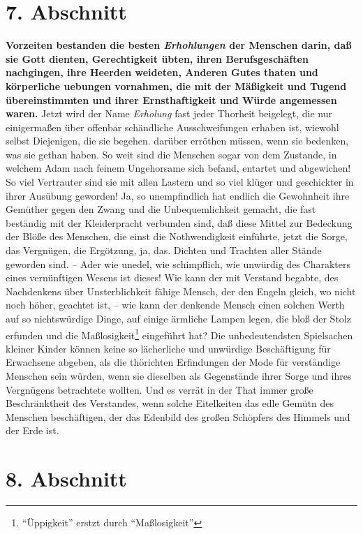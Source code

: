 \section{7. Abschnitt} \label{kap14_ab7}

 \textbf{Vorzeiten bestanden die besten \textit{Erhohlungen} der Menschen darin, daß sie Gott
dienten, Gerechtigkeit übten, ihren Berufsgeschäften nachgingen, ihre Heerden
weideten, Anderen Gutes thaten und körperliche uebungen vornahmen, die mit der
Mäßigkeit und Tugend übereinstimmten und ihrer Ernsthaftigkeit und Würde
angemessen waren.} Jetzt wird der Name \textit{Erholung} fast jeder Thorheit
beigelegt, die nur einigermaßen über offenbar schändliche Ausschweifungen
erhaben ist, wiewohl selbst Diejenigen, die sie begehen. darüber erröthen
müssen, wenn sie bedenken, was sie gethan haben. So weit sind die Menschen sogar
von dem Zustande, in welchem Adam nach feinem Ungehorsame sich befand, entartet
und abgewichen! So viel Vertrauter sind sie mit allen Lastern und so viel klüger
und geschickter in ihrer Ausübung geworden! Ja, so unempfindlich hat endlich die
Gewohnheit ihre Gemüther gegen den Zwang und die Unbequemlichkeit gemacht, die
fast beständig mit der Kleiderpracht verbunden sind, daß diese Mittel zur
Bedeckung der Blöße des Menschen, die einst die Nothwendigkeit einführte, jetzt
die Sorge, das Vergnügen, die Ergötzung, ja, das. Dichten und Trachten aller
Stände geworden sind. -- Ader wie unedel, wie schimpflich, wie unwürdig des
Charakters eines vernünftigen Wesens ist dieses! Wie kann der mit Verstand
begabte, des Nachdenkens über Unsterblichkeit fähige Mensch, der den Engeln
gleich, wo nicht noch höher, geachtet ist, -- wie kann der denkende Mensch einen
solchen Werth auf so nichtswürdige Dinge, auf einige ärmliche Lampen legen, die
bloß der Stolz erfunden und die Maßlosigkeit\footnote{"`Üppigkeit"' erstzt durch "`Maßlosigkeit"'} eingeführt hat? Die unbedeutendsten
Spielsachen kleiner Kinder können keine so lächerliche und unwürdige
Beschäftigung für Erwachsene abgeben, als die thörichten Erfindungen der Mode
für verständige Menschen sein würden, wenn sie dieselben als Gegenstände ihrer
Sorge und ihres Vergnügens betrachtete wollten. Und es verrät in der That immer
große Beschränktheit des Verstandes, wenn solche Eitelkeiten das edle Gemütn des
Menschen beschäftigen, der das Edenbild des großen Schöpfers des Himmels und der
Erde ist.

\section{8. Abschnitt} \label{kap14_ab8}

